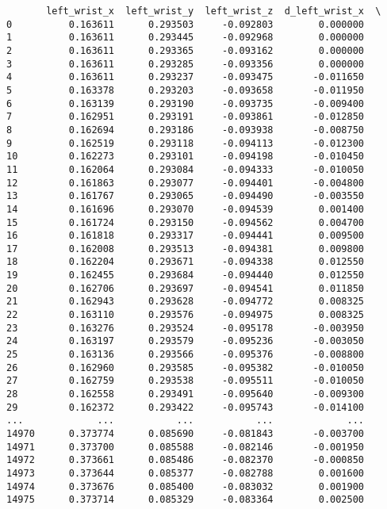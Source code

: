 \documentclass[11pt]{article}
\begin{document}
    
    \begin{verbatim}
       left_wrist_x  left_wrist_y  left_wrist_z  d_left_wrist_x  \
0          0.163611      0.293503     -0.092803        0.000000   
1          0.163611      0.293445     -0.092968        0.000000   
2          0.163611      0.293365     -0.093162        0.000000   
3          0.163611      0.293285     -0.093356        0.000000   
4          0.163611      0.293237     -0.093475       -0.011650   
5          0.163378      0.293203     -0.093658       -0.011950   
6          0.163139      0.293190     -0.093735       -0.009400   
7          0.162951      0.293191     -0.093861       -0.012850   
8          0.162694      0.293186     -0.093938       -0.008750   
9          0.162519      0.293118     -0.094113       -0.012300   
10         0.162273      0.293101     -0.094198       -0.010450   
11         0.162064      0.293084     -0.094333       -0.010050   
12         0.161863      0.293077     -0.094401       -0.004800   
13         0.161767      0.293065     -0.094490       -0.003550   
14         0.161696      0.293070     -0.094539        0.001400   
15         0.161724      0.293150     -0.094562        0.004700   
16         0.161818      0.293317     -0.094441        0.009500   
17         0.162008      0.293513     -0.094381        0.009800   
18         0.162204      0.293671     -0.094338        0.012550   
19         0.162455      0.293684     -0.094440        0.012550   
20         0.162706      0.293697     -0.094541        0.011850   
21         0.162943      0.293628     -0.094772        0.008325   
22         0.163110      0.293576     -0.094975        0.008325   
23         0.163276      0.293524     -0.095178       -0.003950   
24         0.163197      0.293579     -0.095236       -0.003050   
25         0.163136      0.293566     -0.095376       -0.008800   
26         0.162960      0.293585     -0.095382       -0.010050   
27         0.162759      0.293538     -0.095511       -0.010050   
28         0.162558      0.293491     -0.095640       -0.009300   
29         0.162372      0.293422     -0.095743       -0.014100   
...             ...           ...           ...             ...   
14970      0.373774      0.085690     -0.081843       -0.003700   
14971      0.373700      0.085588     -0.082146       -0.001950   
14972      0.373661      0.085486     -0.082370       -0.000850   
14973      0.373644      0.085377     -0.082788        0.001600   
14974      0.373676      0.085400     -0.083032        0.001900   
14975      0.373714      0.085329     -0.083364        0.002500   

\end{verbatim}
\end{document}
